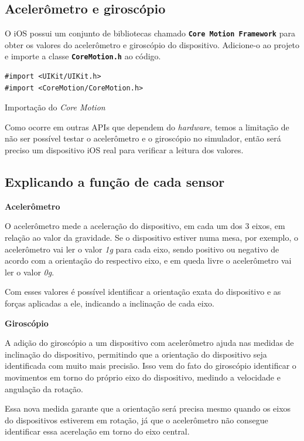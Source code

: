 \documentclass[a4paper,12pt,brazil,doubleside]{book}
\begin{document}
\begin{singlespace}
\section{Acelerômetro e giroscópio}


O iOS possui um conjunto de bibliotecas chamado \texttt{\textbf{Core Motion Framework}} para obter os valores do acelerômetro e giroscópio do dispositivo. Adicione-o ao projeto e importe a classe \texttt{\textbf{CoreMotion.h}} ao código.

\begin{listing}[H]
\begin{verbatim}
#import <UIKit/UIKit.h>
#import <CoreMotion/CoreMotion.h>
\end{verbatim}
\caption{Importação do \emph{Core Motion}}
\end{listing}


Como ocorre em outras APIs que dependem do \emph{hardware}, temos a limitação de não ser possível testar o acelerômetro e o giroscópio no simulador, então será preciso um dispositivo iOS real para verificar a leitura dos valores.

\subsection{Explicando a função de cada sensor}


\textbf{Acelerômetro}


O acelerômetro mede a aceleração do dispositivo, em cada um dos 3 eixos, em relação ao valor da gravidade. Se o dispositivo estiver numa mesa, por exemplo, o acelerômetro vai ler o valor \emph{1g} para cada eixo, sendo positivo ou negativo de acordo com a orientação do respectivo eixo, e em queda livre o acelerômetro vai ler o valor \emph{0g}.

Com esses valores é possível identificar a orientação exata do dispositivo e as forças aplicadas a ele, indicando a inclinação de cada eixo.	

\textbf{Giroscópio}

A adição do giroscópio a um dispositivo com acelerômetro ajuda nas medidas de inclinação do dispositivo, permitindo que a orientação do dispositivo seja identificada com muito mais precisão. Isso vem do fato do giroscópio identificar o movimentos em torno do próprio eixo do dispositivo, medindo a velocidade e angulação da rotação.

Essa nova medida garante que a orientação será precisa mesmo quando os eixos do dispositivos estiverem em rotação, já que o acelerômetro não consegue identificar essa acerelação em torno do eixo central.


\end{singlespace}
\end{document}

